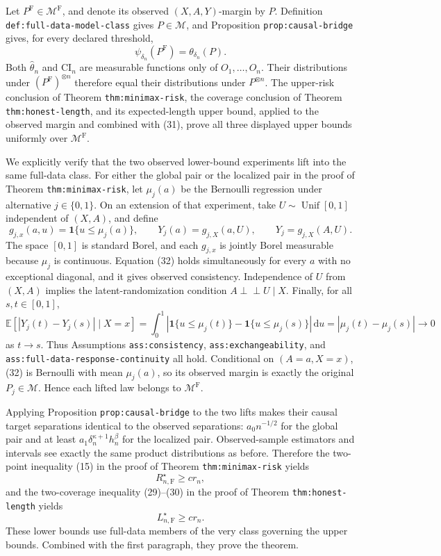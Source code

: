 Let \(P^{\mathrm F}\in\mathcal M^{\mathrm F}\), and denote its observed \((X,A,Y)\)-margin by \(P\).  Definition \texttt{def:full-data-model-class} gives \(P\in\mathcal M\), and Proposition \texttt{prop:causal-bridge} gives, for every declared threshold,
\[
 \psi_{\delta_n}(P^{\mathrm F})=\theta_{\delta_n}(P). \tag{31}
\]
Both \(\widehat\theta_n\) and \(\mathrm{CI}_n\) are measurable functions only of \(O_1,\ldots,O_n\).  Their distributions under \((P^{\mathrm F})^{\otimes n}\) therefore equal their distributions under \(P^{\otimes n}\).  The upper-risk conclusion of Theorem \texttt{thm:minimax-risk}, the coverage conclusion of Theorem \texttt{thm:honest-length}, and its expected-length upper bound, applied to the observed margin and combined with (31), prove all three displayed upper bounds uniformly over \(\mathcal M^{\mathrm F}\).

We explicitly verify that the two observed lower-bound experiments lift into the same full-data class.  For either the global pair or the localized pair in the proof of Theorem \texttt{thm:minimax-risk}, let \(\mu_j(a)\) be the Bernoulli regression under alternative \(j\in\{0,1\}\).  On an extension of that experiment, take \(U\sim\operatorname{Unif}[0,1]\) independent of \((X,A)\), and define
\[
 g_{j,x}(a,u)=\mathbf 1\{u\leq\mu_j(a)\},
 \qquad
 Y_j(a)=g_{j,X}(a,U),
 \qquad
 Y_j=g_{j,X}(A,U). \tag{32}
\]
The space \([0,1]\) is standard Borel, and each \(g_{j,x}\) is jointly Borel measurable because \(\mu_j\) is continuous.  Equation (32) holds simultaneously for every \(a\) with no exceptional diagonal, and it gives observed consistency.  Independence of \(U\) from \((X,A)\) implies the latent-randomization condition \(A\mathbin{\perp\!\!\!\perp}U\mid X\).  Finally, for all \(s,t\in[0,1]\),
\[
 \mathbb E[|Y_j(t)-Y_j(s)|\mid X=x]
 =\int_0^1|\mathbf 1\{u\leq\mu_j(t)\}-\mathbf 1\{u\leq\mu_j(s)\}|\,\mathrm du
 =|\mu_j(t)-\mu_j(s)|\longrightarrow0 \tag{33}
\]
as \(t\to s\).  Thus Assumptions \texttt{ass:consistency}, \texttt{ass:exchangeability}, and \texttt{ass:full-data-response-continuity} all hold.  Conditional on \((A=a,X=x)\), (32) is Bernoulli with mean \(\mu_j(a)\), so its observed margin is exactly the original \(P_j\in\mathcal M\).  Hence each lifted law belongs to \(\mathcal M^{\mathrm F}\).

Applying Proposition \texttt{prop:causal-bridge} to the two lifts makes their causal target separations identical to the observed separations: \(a_0n^{-1/2}\) for the global pair and at least \(a_1\delta_n^{\kappa+1}h_n^\beta\) for the localized pair.  Observed-sample estimators and intervals see exactly the same product distributions as before.  Therefore the two-point inequality (15) in the proof of Theorem \texttt{thm:minimax-risk} yields
\[
 R_{n,\mathrm F}^\star\geq cr_n,
\]
and the two-coverage inequality (29)--(30) in the proof of Theorem \texttt{thm:honest-length} yields
\[
 L_{n,\mathrm F}^\star\geq cr_n.
\]
These lower bounds use full-data members of the very class governing the upper bounds.  Combined with the first paragraph, they prove the theorem.